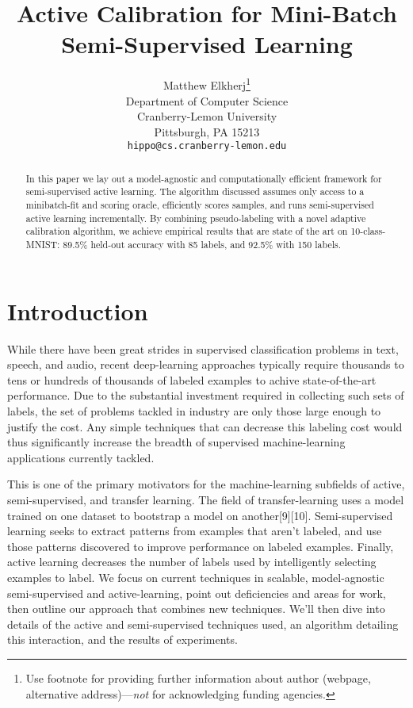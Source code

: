 \documentclass{article}
\title{Active Calibration for Mini-Batch Semi-Supervised Learning}
\author{
  Matthew Elkherj\thanks{Use footnote for providing further
    information about author (webpage, alternative
    address)---\emph{not} for acknowledging funding agencies.} \\
  Department of Computer Science\\
  Cranberry-Lemon University\\
  Pittsburgh, PA 15213 \\
  \texttt{hippo@cs.cranberry-lemon.edu} \\
}
\begin{document}

\maketitle

\begin{abstract}
In this paper we lay out a model-agnostic and computationally efficient framework for semi-supervised active learning.  The algorithm discussed assumes only access to a minibatch-fit and scoring oracle, efficiently scores samples, and runs semi-supervised active learning incrementally.  By combining pseudo-labeling with a novel adaptive calibration algorithm, we achieve empirical results that are state of the art on 10-class-MNIST: 89.5\% held-out accuracy with 85 labels, and 92.5\% with 150 labels.  
\end{abstract}

\section{Introduction}
While there have been great strides in supervised classification problems in text, speech, and audio, recent deep-learning approaches typically require thousands to tens or hundreds of thousands of labeled examples to achive state-of-the-art performance.  Due to the substantial investment required in collecting such sets of labels, the set of problems tackled in industry are only those large enough to justify the cost.  Any simple techniques that can decrease this labeling cost would thus significantly increase the breadth of supervised machine-learning applications currently tackled.  

This is one of the primary motivators for the machine-learning subfields of active, semi-supervised, and transfer learning.  The field of transfer-learning uses a model trained on one dataset to bootstrap a model on another[9][10].  Semi-supervised learning seeks to extract patterns from examples that aren't labeled, and use those patterns discovered to improve performance on labeled examples.  Finally, active learning decreases the number of labels used by intelligently selecting examples to label.  We focus on current techniques in scalable, model-agnostic semi-supervised and active-learning, point out deficiencies and areas for work, then outline our approach that combines new techniques.  We'll then dive into details of the active and semi-supervised techniques used, an algorithm detailing this interaction, and the results of experiments.  
\end{document}
